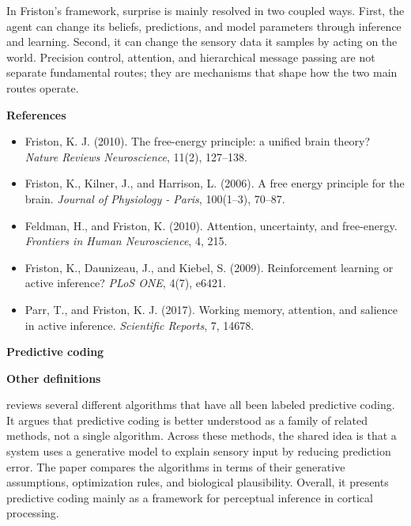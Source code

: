 \documentclass{book}
\providecommand{\ProjectDeepHeading}[2]{%
    \par\medskip\noindent\textbf{#2}\par\smallskip
}
\begin{document}
        In Friston's framework, surprise is mainly resolved in two coupled ways. First, the agent can change its beliefs, predictions, and model parameters through inference and learning. Second, it can change the sensory data it samples by acting on the world. Precision control, attention, and hierarchical message passing are not separate fundamental routes; they are mechanisms that shape how the two main routes operate.
    
    
    \ProjectDeepHeading{13}{References}
        \begin{itemize}[leftmargin=1.8em]
	\item Friston, K. J. (2010). The free-energy principle: a unified brain theory? \textit{Nature Reviews Neuroscience}, 11(2), 127--138.
    \item Friston, K., Kilner, J., and Harrison, L. (2006). A free energy principle for the brain. \textit{Journal of Physiology - Paris}, 100(1--3), 70--87.
    \item Feldman, H., and Friston, K. (2010). Attention, uncertainty, and free-energy. \textit{Frontiers in Human Neuroscience}, 4, 215.
    \item Friston, K., Daunizeau, J., and Kiebel, S. (2009). Reinforcement learning or active inference? \textit{PLoS ONE}, 4(7), e6421.
    \item Parr, T., and Friston, K. J. (2017). Working memory, attention, and salience in active inference. \textit{Scientific Reports}, 7, 14678.
        \end{itemize}

\ProjectDeepHeading{7}{Predictive coding}


\ProjectDeepHeading{10}{Other definitions}
        \cite{spratling-2017-a-review-of-predictive-coding-algorithms} reviews several different algorithms that have all been labeled predictive coding. It argues that predictive coding is better understood as a family of related methods, not a single algorithm. Across these methods, the shared idea is that a system uses a generative model to explain sensory input by reducing prediction error. The paper compares the algorithms in terms of their generative assumptions, optimization rules, and biological plausibility.
        Overall, it presents predictive coding mainly as a framework for perceptual inference in cortical processing.
        
\end{document}
